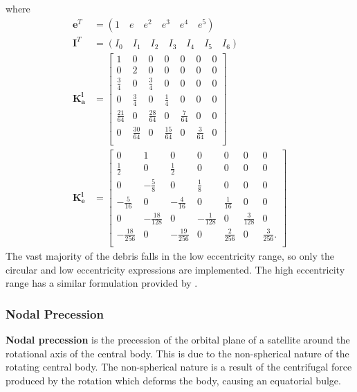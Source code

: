 \documentclass[a4paper, 12pt]{article}
\newcommand{\lindex}[1]{%
	\lowercase{\def\temp{#1}}%
	\expandafter\index\expandafter{\temp}%
}
\newcommand{\boldindex}[1]{%
	\textbf{#1}\lindex{#1}%
}
\begin{document}
where \begin{align}
	 \boldsymbol{e}^T &=(1\quad  e\quad e^2\quad e^3\quad e^4\quad e^5)\\
	\boldsymbol{I}^T &=(I_0\quad  I_1\quad I_2\quad I_3\quad I_4\quad I_5\quad I_6)\\
	\boldsymbol{K_a^l} &= \begin{bmatrix}
		1 & 0 & 0 & 0 &0&0 &0\\
		0 & 2 & 0 & 0 &0&0 &0\\
		\frac{3}{4} & 0 & \frac{3}{4} & 0 &0&0 &0\\
		0 & \frac{3}{4} & 0 & \frac{1}{4} &0&0 &0\\
	    \frac{21}{64} & 0 & \frac{28}{64} & 0 &\frac{7}{64}&0 &0\\
	    0 & \frac{30}{64} & 0 & \frac{15}{64} &0&\frac{3}{64} &0\\
	\end{bmatrix}\\
	\boldsymbol{K_e^l} &= \begin{bmatrix}
		0 & 1 & 0 & 0 &0&0 &0\\
		\frac{1}{2} & 0 & \frac{1}{2} & 0 &0&0 &0\\
		0 & -\frac{5}{8}  & 0 & \frac{1}{8}  &0&0 &0\\
		-\frac{5}{16}  & 0 & -\frac{4}{16}  &0 &\frac{1}{16} &0 &0\\
		0 & -\frac{18}{128} & 0& -\frac{1}{128}  &0&\frac{3}{128}  &0\\
		-\frac{18}{256}  & 0 & -\frac{19}{256}  & 0 &\frac{2}{256} &0 &\frac{3}{256}.\\
	\end{bmatrix}
\end{align}
The vast majority of the debris falls in the low eccentricity range, so only the circular and low eccentricity expressions are implemented. The high eccentricity range has a similar formulation provided by \cite{frey_extension_2019}.

\subsubsection{Nodal Precession}

\boldindex{Nodal precession} is the precession of the orbital plane of a satellite around the rotational axis of the central body. This is due to the non-spherical nature of the rotating central body. The non-spherical nature is a result of the centrifugal force produced by the rotation which  deforms the body, causing an equatorial bulge.
\end{document}
